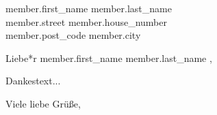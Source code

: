 \documentclass[
               DIV=15,
               fontsize=10pt,
               parskip=half,
               enlargefirstpage=true,
               fromalign=right,
               fromrule=afteraddress,
               fromlogo,
              ]{scrlttr2}
\begin{document}
\begin{letter}{ {{ member.first_name }} {{ member.last_name }} \\
                {{ member.street }} {{ member.house_number }} \\
                {{ member.post_code }} {{ member.city }} }

\opening{Liebe*r {{ member.first_name }} {{ member.last_name }},}
Dankestext...
\closing{Viele liebe Grüße,}

\end{letter}
\end{document}

